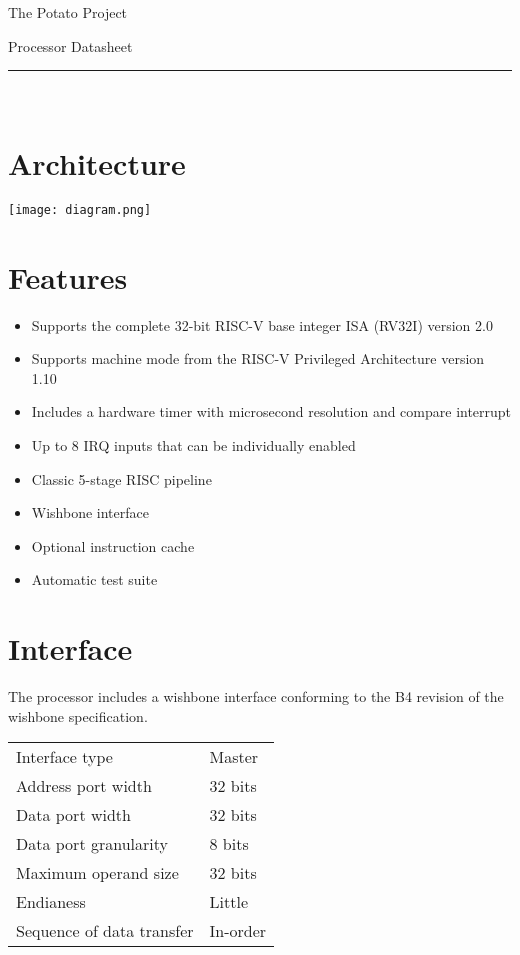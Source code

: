 \documentclass[10pt,a4paper]{article}
\begin{document}
\begin{minipage}{0.5\textwidth}
\raggedright\huge
\textsf{The Potato Project}
\end{minipage}
\begin{minipage}{0.5\textwidth}
\raggedleft\huge
\textsf{Processor Datasheet}
\end{minipage}

\vspace{0.5em}
\noindent\rule{\linewidth}{1pt}\\

\begin{minipage}[t]{0.48\textwidth}

\section{Architecture}
\texttt{[image: diagram.png]}

\section{Features}

\begin{itemize}
\item Supports the complete 32-bit RISC-V base integer ISA (RV32I) version 2.0
\item Supports machine mode from the RISC-V Privileged Architecture version 1.10
\item Includes a hardware timer with microsecond resolution and compare interrupt
\item Up to 8 IRQ inputs that can be individually enabled
\item Classic 5-stage RISC pipeline
\item Wishbone interface
\item Optional instruction cache
\item Automatic test suite
\end{itemize}

\section{Interface}

The processor includes a wishbone interface conforming to the B4 revision of the
wishbone specification.\\

\begin{tabularx}{\textwidth}{|l|X|}
\hline
Interface type & Master \\
Address port width & 32 bits \\
Data port width & 32 bits \\
Data port granularity & 8 bits \\
Maximum operand size & 32 bits \\
Endianess & Little \\
Sequence of data transfer & In-order \\
\hline
\end{tabularx}


\end{minipage}
\end{document}
